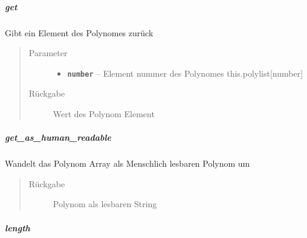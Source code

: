 \documentclass[letterpaper,10pt,ngerman]{sphinxmanual}
\begin{document}
\subparagraph{get}
\label{com/linuxluigi/polynomial/Polynomial:id3}

\begin{fulllineitems}
\label{com/linuxluigi/polynomial/Polynomial:com.linuxluigi.polynomial.Polynomial.get(int)}
Gibt ein Element des Polynomes zurück
\begin{quote}\begin{description}
\item[{Parameter}] \leavevmode\begin{itemize}
\item {} 
\textbf{\texttt{number}} -- Element nummer des Polynomes this.polylist{[}number{]}

\end{itemize}

\item[{Rückgabe}] \leavevmode
Wert des Polynom Element

\end{description}\end{quote}

\end{fulllineitems}



\subparagraph{get\_as\_human\_readable}
\label{com/linuxluigi/polynomial/Polynomial:get-as-human-readable}

\begin{fulllineitems}
\label{com/linuxluigi/polynomial/Polynomial:com.linuxluigi.polynomial.Polynomial.get_as_human_readable()}
Wandelt das Polynom Array als Menschlich lesbaren Polynom um
\begin{quote}\begin{description}
\item[{Rückgabe}] \leavevmode
Polynom als lesbaren String

\end{description}\end{quote}

\end{fulllineitems}



\subparagraph{length}
\label{com/linuxluigi/polynomial/Polynomial:length}
\end{document}
